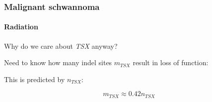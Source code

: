 \documentclass{beamer}
\begin{document}
\begin{frame}
    \frametitle{Malignant schwannoma}
    \framesubtitle{Radiation}
    \begin{center}
        Why do we care about \emph{TSX} anyway?
    \end{center}

    \begin{center}
        Need to know how many indel sites $m_{TSX}$ result in loss of function:
    \end{center}

    \begin{center}
        This is predicted by $n_{TSX}$:
    \end{center}

    \begin{equation*}
        m_{TSX} \approx 0.42 n_{TSX}
    \end{equation*}
\end{frame}
\end{document}
